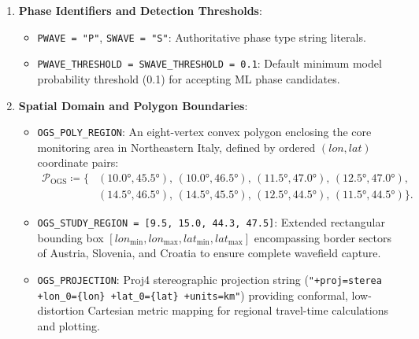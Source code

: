 \begin{enumerate}
  \item \textbf{Phase Identifiers and Detection Thresholds}:
    \begin{itemize}
      \item \texttt{PWAVE = "P"}, \texttt{SWAVE = "S"}: Authoritative phase
        type string literals.
      \item \texttt{PWAVE\_THRESHOLD = SWAVE\_THRESHOLD = 0.1}: Default minimum
        model probability threshold (\num{0.1}) for accepting
        \ac{ML} phase candidates.
    \end{itemize}

  \item \textbf{Spatial Domain and Polygon Boundaries}:
    \begin{itemize}
      \item \texttt{OGS\_POLY\_REGION}: An eight-vertex convex
        polygon enclosing the core monitoring area in Northeastern
        Italy, defined by ordered $(lon, lat)$ coordinate pairs:
        \begin{equation}
          \begin{aligned}
            \mathcal{P}_{\mathrm{OGS}} \coloneqq \{ &(\ang{10.0},
              \ang{45.5}),\, (\ang{10.0}, \ang{46.5}),\,
              (\ang{11.5}, \ang{47.0}),\, (\ang{12.5}, \ang{47.0}), \\
              &(\ang{14.5}, \ang{46.5}),\, (\ang{14.5}, \ang{45.5}),\,
            (\ang{12.5}, \ang{44.5}),\, (\ang{11.5}, \ang{44.5}) \}.
          \end{aligned}
          \label{eq:ogs_poly_coords}
        \end{equation}
      \item \texttt{OGS\_STUDY\_REGION = [9.5, 15.0, 44.3, 47.5]}:
        Extended rectangular bounding box $[lon_{\min}, lon_{\max},
        lat_{\min}, lat_{\max}]$ encompassing border sectors of
        Austria, Slovenia, and Croatia to ensure complete wavefield capture.
      \item \texttt{OGS\_PROJECTION}: Proj4 stereographic projection
        string (\texttt{"+proj=sterea +lon\_0=\{lon\}
        +lat\_0=\{lat\} +units=km"}) providing conformal,
        low-distortion Cartesian metric mapping for regional
        travel-time calculations and plotting.
    \end{itemize}


\end{enumerate}
